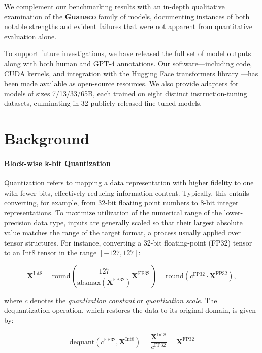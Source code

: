 We complement our benchmarking results with an in-depth qualitative examination of the \textbf{Guanaco} family of models, documenting instances of both notable strengths and evident failures that were not apparent from quantitative evaluation alone.

To support future investigations, we have released the full set of model outputs along with both human and GPT-4 annotations. Our software—including code, CUDA kernels, and integration with the Hugging Face transformers library \citep{wolf2019huggingface}—has been made available as open-source resources. We also provide adapters for models of sizes 7/13/33/65B, each trained on eight distinct instruction-tuning datasets, culminating in 32 publicly released fine-tuned models.

\section{Background}
\paragraph{Block-wise k-bit Quantization} Quantization refers to mapping a data representation with higher fidelity to one with fewer bits, effectively reducing information content. Typically, this entails converting, for example, from 32-bit floating point numbers to 8-bit integer representations. To maximize utilization of the numerical range of the lower-precision data type, inputs are generally scaled so that their largest absolute value matches the range of the target format, a process usually applied over tensor structures. For instance, converting a 32-bit floating-point (FP32) tensor to an Int8 tensor in the range $[-127, 127]$:

\begin{equation}
    \mathbf{X}^{ \text{Int8}} = \text{round}\left( \frac{127}{{\text{absmax}}(\mathbf{X}^{{\text{FP32}}})}\mathbf{X}^{{\text{FP32}}} \right) = \text{round}(c^{\text{FP32}}\cdot \mathbf{X}^{{\text{FP32}}}),
\end{equation}

where $c$ denotes the {\em quantization constant} or {\em quantization scale}. The dequantization operation, which restores the data to its original domain, is given by:

\begin{equation}
    \text{dequant}(c^{\text{FP32}}, \mathbf{X}^{\text{Int8}}) = \frac{\mathbf{X}^{\text{Int8}}}{c^{\text{FP32}}} = \mathbf{X}^{\text{FP32}}
\end{equation}

